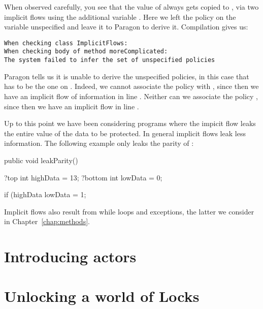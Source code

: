 When observed carefully, you see that the value of  always
gets copied to , via two implicit flows using the additional
variable . Here we left the policy on the variable 
unspecified and leave it to Paragon to derive it. Compilation gives us:

\begin{lstlisting}
When checking class ImplicitFlows:
When checking body of method moreComplicated:
The system failed to infer the set of unspecified policies
\end{lstlisting}

Paragon tells us it is unable to derive the unspecified policies, in this case
that has to be the one on . Indeed, we cannot associate the
policy  with , since then we have an implicit
flow of information in line .  Neither can we associate the
policy , since then we have an implicit flow in line
.

Up to this point we have been considering programs where the impicit flow leaks
the entire value of the data to be protected. In general implicit flows leak
less information. The following example only leaks the parity of 
:

\begin{paragoncode}
  public void leakParity() {
  
    ?top int highData = 13;
    ?bottom int lowData = 0;
    
    if (highData %
      lowData = 1;
      
  }
\end{paragoncode}

Implicit flows also result from while loops and exceptions, the latter we 
consider in Chapter~\ref{chap:methods}.

\section{Introducing actors}

\section{Unlocking a world of Locks}
